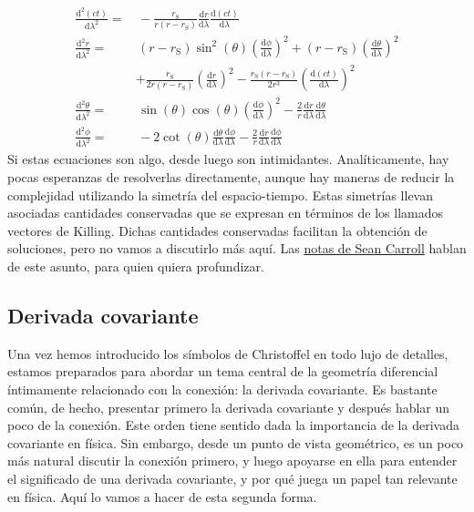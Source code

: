 \begin{subequations}
    \begin{align}
        \frac{\mathrm{d}^2(ct)}{\mathrm{d}\lambda^2} =&\, -\frac{r_\mathrm{S}}{r(r-r_\mathrm{S})} \frac{\mathrm{d} r}{\mathrm{d}\lambda} \frac{\mathrm{d}(ct)}{\mathrm{d}\lambda}\\
        \nonumber
        \frac{\mathrm{d}^2r}{\mathrm{d}\lambda^2} =&\, (r-r_\mathrm{S})\sin^2(\theta) \left(\frac{\mathrm{d} \phi}{\mathrm{d}\lambda}\right)^2 + (r-r_\mathrm{S}) \left(\frac{\mathrm{d} \theta}{\mathrm{d}\lambda}\right)^2 \\
        &+ \frac{r_\mathrm{S}}{2r(r-r_\mathrm{S})} \left(\frac{\mathrm{d} r}{\mathrm{d}\lambda}\right)^2 - \frac{r_\mathrm{S}(r-r_\mathrm{S})}{2r^3} \left(\frac{\mathrm{d}(ct)}{\mathrm{d}\lambda}\right)^2\\
        \frac{\mathrm{d}^2\theta}{\mathrm{d}\lambda^2} =&\, \sin(\theta)\cos(\theta) \left(\frac{\mathrm{d}\phi}{\mathrm{d}\lambda}\right)^2 - \frac{2}{r} \frac{\mathrm{d}r}{\mathrm{d}\lambda}\frac{\mathrm{d}\theta}{\mathrm{d}\lambda}\\
        \frac{\mathrm{d}^2\phi}{\mathrm{d}\lambda^2} =&\, -2\cot(\theta) \frac{\mathrm{d}\theta}{\mathrm{d}\lambda}\frac{\mathrm{d}\phi}{\mathrm{d}\lambda} - \frac{2}{r} \frac{\mathrm{d}r}{\mathrm{d}\lambda}\frac{\mathrm{d}\phi}{\mathrm{d}\lambda}
    \end{align}
\end{subequations}
Si estas ecuaciones son algo, desde luego son intimidantes. Analíticamente, hay pocas esperanzas de resolverlas directamente, aunque hay maneras de reducir la complejidad utilizando la simetría del espacio-tiempo. Estas simetrías llevan asociadas cantidades conservadas que se expresan en términos de los llamados vectores de Killing. Dichas cantidades conservadas facilitan la obtención de soluciones, pero no vamos a discutirlo más aquí. Las \href{https://preposterousuniverse.com/grnotes/}{notas de Sean Carroll} hablan de este asunto, para quien quiera profundizar.

\subsection{Derivada covariante}
\label{subsec.4derivadacovariante}

Una vez hemos introducido los símbolos de Christoffel en todo lujo de detalles, estamos preparados para abordar un tema central de la geometría diferencial íntimamente relacionado con la conexión: la derivada covariante. Es bastante común, de hecho, presentar primero la derivada covariante y después hablar un poco de la conexión. Este orden tiene sentido dada la importancia de la derivada covariante en física. Sin embargo, desde un punto de vista geométrico, es un poco más natural discutir la conexión primero, y luego apoyarse en ella para entender el significado de una derivada covariante, y por qué juega un papel tan relevante en física. Aquí lo vamos a hacer de esta segunda forma.


